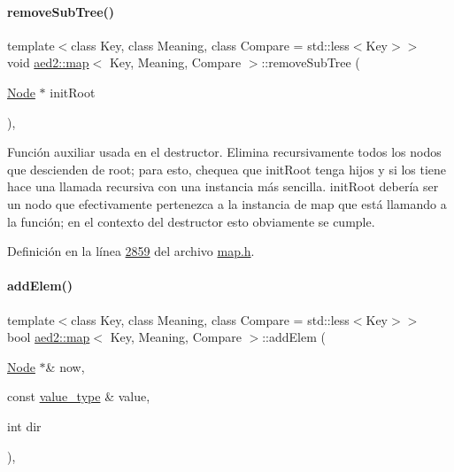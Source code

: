 \paragraph{\texorpdfstring{remove\+Sub\+Tree()}{removeSubTree()}}
{\footnotesize\ttfamily template$<$class Key, class Meaning, class Compare = std\+::less$<$\+Key$>$$>$ \\
void \hyperlink{classaed2_1_1map}{aed2\+::map}$<$ Key, Meaning, Compare $>$\+::remove\+Sub\+Tree (\begin{DoxyParamCaption}\item[{\hyperlink{structaed2_1_1map_1_1Node}{Node} $\ast$}]{init\+Root }\end{DoxyParamCaption})\hspace{0.3cm}{\ttfamily [inline]}, {\ttfamily [private]}}



Función auxiliar usada en el destructor. Elimina recursivamente todos los nodos que descienden de root; para esto, chequea que init\+Root tenga hijos y si los tiene hace una llamada recursiva con una instancia más sencilla. init\+Root debería ser un nodo que efectivamente pertenezca a la instancia de map que está llamando a la función; en el contexto del destructor esto obviamente se cumple. 



Definición en la línea \hyperlink{map_8h_source_l02859}{2859} del archivo \hyperlink{map_8h_source}{map.\+h}.

\mbox{\label{classaed2_1_1map_a709e1a06ac3c5932c1eb6d9741f37b2c_a709e1a06ac3c5932c1eb6d9741f37b2c}} 
\paragraph{\texorpdfstring{add\+Elem()}{addElem()}}
{\footnotesize\ttfamily template$<$class Key, class Meaning, class Compare = std\+::less$<$\+Key$>$$>$ \\
bool \hyperlink{classaed2_1_1map}{aed2\+::map}$<$ Key, Meaning, Compare $>$\+::add\+Elem (\begin{DoxyParamCaption}\item[{\hyperlink{structaed2_1_1map_1_1Node}{Node} $\ast$\&}]{now,  }\item[{const \hyperlink{classaed2_1_1map_a719db98e0ff9a837610f76be33264680_a719db98e0ff9a837610f76be33264680}{value\+\_\+type} \&}]{value,  }\item[{int}]{dir }\end{DoxyParamCaption})\hspace{0.3cm}{\ttfamily [inline]}, {\ttfamily [private]}}



